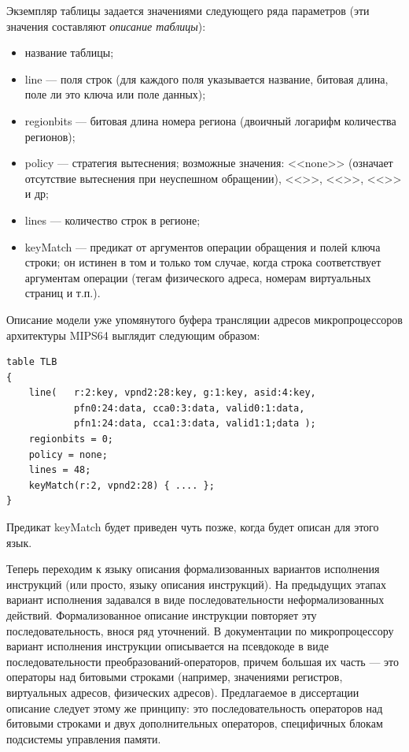 Экземпляр таблицы задается значениями следующего ряда параметров (эти значения составляют \emph{описание таблицы}):
\begin{itemize}
    \item название таблицы;
    \item line --- поля строк (для каждого поля указывается название, битовая длина, поле
ли это ключа или поле данных);
    \item regionbits --- битовая длина номера региона (двоичный логарифм количества регионов);
    \item policy --- стратегия вытеснения; возможные значения: <<none>> (означает отсутствие вытеснения при неуспешном обращении), <<\LRU>>, <<\FIFO>>, <<\PseudoLRU>> и др;
    \item lines --- количество строк в регионе;
    \item keyMatch --- предикат от аргументов операции обращения и полей ключа строки; он истинен в том и только том случае, когда строка соответствует аргументам операции (тегам физического адреса, номерам виртуальных страниц и т.п.).
\end{itemize}

Описание модели уже упомянутого буфера трансляции адресов микропроцессоров архитектуры
MIPS64 выглядит следующим образом:
\begin{verbatim}
table TLB
{
    line(   r:2:key, vpnd2:28:key, g:1:key, asid:4:key,
            pfn0:24:data, cca0:3:data, valid0:1:data,
            pfn1:24:data, cca1:3:data, valid1:1;data );
    regionbits = 0;
    policy = none;
    lines = 48;
    keyMatch(r:2, vpnd2:28) { .... };
}
\end{verbatim}

Предикат keyMatch будет приведен чуть позже, когда будет описан для этого язык.

Теперь переходим к языку описания формализованных вариантов исполнения инструкций (или просто, языку описания инструкций). На предыдущих этапах вариант исполнения задавался в виде последовательности неформализованных действий. Формализованное описание инструкции повторяет эту последовательность, внося ряд уточнений. В документации по микропроцессору вариант исполнения инструкции описывается на псевдокоде в виде последовательности преобразований-операторов, причем большая их часть --- это операторы над битовыми строками (например, значениями регистров, виртуальных адресов, физических адресов). Предлагаемое в диссертации описание следует этому же принципу: это последовательность операторов над битовыми строками и двух дополнительных операторов, специфичных блокам подсистемы управления памяти.

